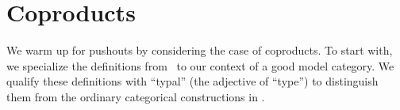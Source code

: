 




\section{Coproducts}
\label{sec:coproducts}

We warm up for pushouts by considering the case of coproducts.
To start with, we specialize the definitions from~\cite[.1]{lw:localuniv} to our context of a good model category.
We qualify these definitions with ``typal'' (the adjective of ``type'') to distinguish them from the ordinary categorical constructions in \sM.

